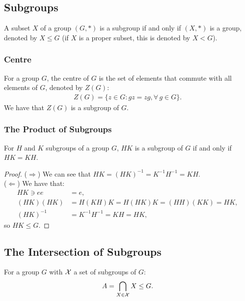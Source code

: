 \subsection{Subgroups}

A subset $X$ of a group $(G, \ast)$ is a subgroup if and only if $(X, \ast)$
is a group, denoted by $X \leq G$ (if $X$ is a proper subset, this
is denoted by $X < G$).

\subsubsection{Centre} \label{1.8}

For a group $G$, the centre of $G$ is the set of elements that commute with all
elements of $G$, denoted by $Z(G)$: \begin{align*}
    Z(G) = \{z \in G : gz = zg, \forall \, g \in G\}.
\end{align*} We have that $Z(G)$ is a subgroup of $G$.

\newpage

\subsubsection{The Product of Subgroups} \label{1.9}

For $H$ and $K$ subgroups of a group $G$, 
$HK$ is a subgroup of $G$ if and only if $HK = KH$.

\begin{proof}
    ($\Longrightarrow$) We can see that $HK = (HK)^{-1} = K^{-1}H^{-1} = KH$. 
    \\[\baselineskip]
    ($\Longleftarrow$) We have that: \begin{align*}
        HK \ni ee &= e, \\
        (HK)(HK) &= H(KH)K = H(HK)K = (HH)(KK) = HK, \\
        (HK)^{-1} &= K^{-1}H^{-1} = KH = HK,
    \end{align*} so $HK \leq G$.
\end{proof}

\subsection{The Intersection of Subgroups} \label{1.11}

For a group $G$ with $\mathcal{X}$ a set of subgroups of $G$: \begin{align*}
    A = \bigcap_{X \in \mathcal{X}} X \leq G.
\end{align*}

